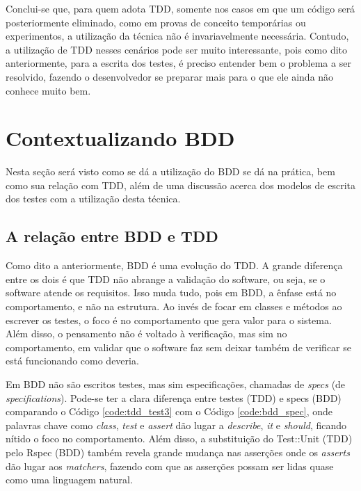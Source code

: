 Conclui-se que, para quem adota TDD, somente nos casos em que um código será posteriormente eliminado, como em provas de conceito temporárias ou experimentos, a utilização da técnica não é invariavelmente necessária. Contudo, a utilização de TDD nesses cenários pode ser muito interessante, pois como dito anteriormente, para a escrita dos testes, é preciso entender bem o problema a ser resolvido, fazendo o desenvolvedor se preparar mais para o que ele ainda não conhece muito bem.


\section{Contextualizando BDD}

Nesta seção será visto como se dá a utilização do BDD se dá na prática, bem como sua relação com TDD, além de uma discussão acerca dos modelos de escrita dos testes com a utilização desta técnica.

\subsection{A relação entre BDD e TDD}
\label{sub:a_relacao_entre_bdd_e_tdd}

Como dito a anteriormente, BDD é uma evolução do TDD. A grande diferença entre os dois é que TDD não abrange a validação do software, ou seja, se o software atende os requisitos. Isso muda tudo, pois em BDD, a ênfase está no comportamento, e não na estrutura. Ao invés de focar em classes e métodos ao escrever os testes, o foco é no comportamento que gera valor para o sistema. Além disso, o pensamento não é voltado à verificação, mas sim no comportamento, em validar que o software faz sem deixar também de verificar se está funcionando como deveria.

Em BDD não são escritos testes, mas sim especificações, chamadas de \textit{specs} (de \textit{specifications}). Pode-se ter a clara diferença entre testes (TDD) e specs (BDD) comparando o Código \ref{code:tdd_test3} com o Código \ref{code:bdd_spec}, onde palavras chave como \textit{class}, \textit{test} e \textit{assert} dão lugar a \textit{describe}, \textit{it} e \textit{should}, ficando nítido o foco no comportamento. Além disso, a substituição do Test::Unit (TDD) pelo Rspec (BDD) também revela grande mudança nas asserções onde os \textit{asserts} dão lugar aos \textit{matchers}, fazendo com que as asserções possam ser lidas quase como uma linguagem natural.

